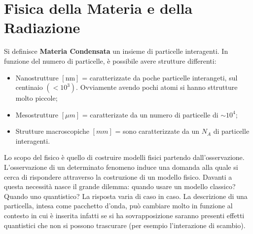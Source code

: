 \section{Fisica della Materia e della Radiazione}
Si definisce \textbf{Materia Condensata} un insieme di particelle interagenti. In funzione del numero di particelle, è possibile avere strutture differenti:
\begin{itemize}
	\item Nanostrutture $[\text{nm}]$ = caratterizzate da poche particelle interangeti, sul centinaio $(<10^3)$. Ovviamente avendo pochi atomi si hanno sttrutture molto piccole;
	\item Mesostrutture $[\mu m]$ = caratterizate da un numero di particelle di $\sim  10^4$;
	\item Strutture macroscopiche $[mm]$ = sono caratterizzate da un $N_A$ di particelle interagenti.
\end{itemize}
Lo scopo del fisico è quello di costruire modelli fisici partendo dall'osservazione. L'osservazione di un determinato fenomeno induce una domanda alla quale si cerca di rispondere attraverso la costruzione di un modello fisico. Davanti a questa necessità nasce il grande dilemma: quando usare un modello classico? Quando uno quantistico? La risposta varia di caso in caso. La descrizione di una particella, intesa come pacchetto d'onda, può cambiare molto in funzione al contesto in cui è inserita infatti se si ha sovrapposizione saranno presenti effetti quantistici che non si possono trascurare (per esempio l'interazione di scambio).

